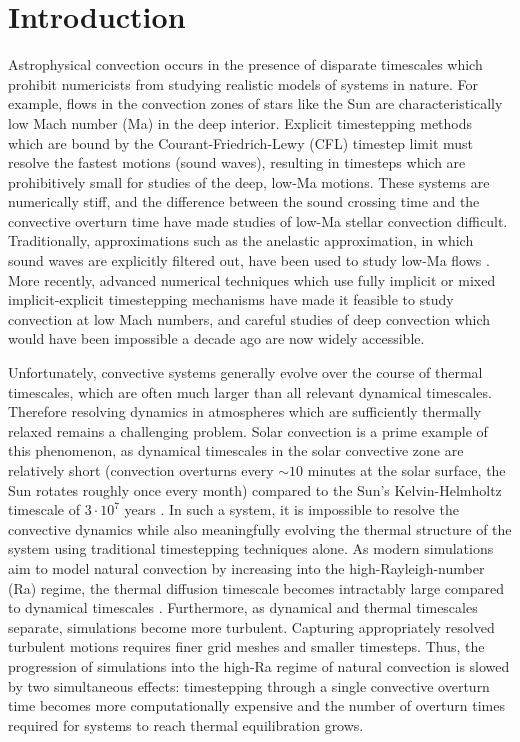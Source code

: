 \documentclass[aps, pre, onecolumn, nofootinbib, notitlepage, groupedaddress, amsfonts, amssymb, amsmath, longbibliography]{revtex4-1}
\begin{document}
\section{Introduction}
\label{sec:intro}
Astrophysical convection occurs in the presence of disparate timescales which
prohibit numericists from studying realistic models of systems in nature.  For example,
flows in the convection zones of stars like the Sun are characteristically low Mach number
(Ma) in the deep interior.
Explicit timestepping methods which are bound by the Courant-Friedrich-Lewy
(CFL) timestep limit must resolve the fastest motions (sound
waves), resulting in timesteps which are prohibitively
small for studies of the deep, low-Ma motions. These systems are numerically
stiff, and the difference between
the sound crossing time and the convective overturn time have made studies of low-Ma stellar
convection difficult. Traditionally, approximations such as
the anelastic approximation, in which sound waves are explicitly filtered out,
have been used to study low-Ma flows \cite{brown&all2010, featherstone&hindman2016}.
More recently, advanced numerical techniques which use fully implicit 
\cite{viallet&all2011, viallet&all2013, viallet&all2016} or mixed
implicit-explicit \cite{lecoanet&all2014, anders&brown2017, bordwell&all2018} 
timestepping mechanisms have made it feasible to study
convection at low Mach numbers, and careful studies of deep convection which
would have been impossible a decade ago are now widely accessible.

Unfortunately, convective systems generally evolve over the course of thermal
timescales, which are often much larger than all relevant
dynamical timescales. Therefore resolving dynamics in atmospheres which are sufficiently
thermally relaxed remains a challenging problem.
Solar convection is a prime example of this phenomenon, as
dynamical timescales in the solar convective zone are relatively short 
(convection overturns every $\sim 10$ minutes at the solar surface, 
the Sun rotates roughly once every month)
compared to the Sun's Kelvin-Helmholtz timescale of
$3 \cdot 10^7$ years \cite{stix2003}.  
In such a system, it is impossible to resolve the convective dynamics while also
meaningfully evolving the thermal structure of the system using
traditional timestepping techniques alone.
As modern simulations aim to model natural convection
by increasing into the high-Rayleigh-number (Ra) regime,
the thermal diffusion timescale becomes intractably large
compared to dynamical timescales \cite{anders&brown2017}.
Furthermore, as dynamical and thermal timescales separate, 
simulations become more turbulent. Capturing appropriately resolved
turbulent motions requires finer grid meshes and smaller timesteps.
Thus, the progression of simulations into the high-Ra
regime of natural convection is slowed by two simultaneous effects: timestepping
through a single convective overturn time becomes more computationally expensive
and the number of overturn times required for systems to reach thermal equilibration
grows.
\end{document}
